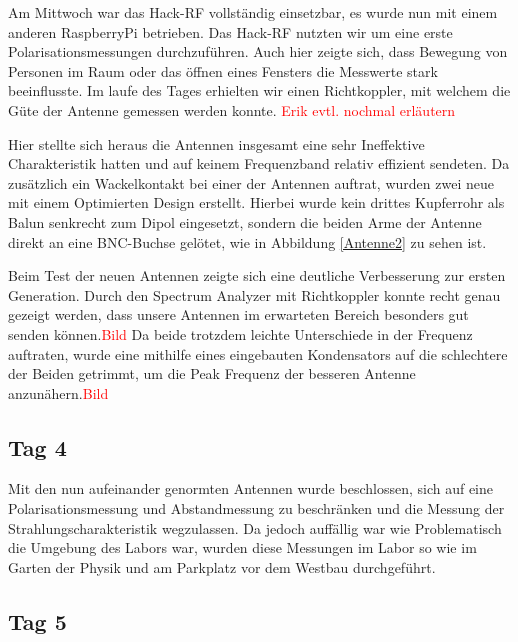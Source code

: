 \documentclass[titlepage,11pt,a4paper,ngerman]{article}
\begin{document}
Am Mittwoch war das Hack-RF vollständig einsetzbar, es wurde nun mit einem anderen RaspberryPi betrieben. Das Hack-RF nutzten wir um eine erste Polarisationsmessungen durchzuführen. Auch hier zeigte sich, dass Bewegung von Personen im Raum oder das öffnen eines Fensters die Messwerte stark beeinflusste. Im laufe des Tages erhielten wir einen Richtkoppler, mit welchem die Güte der Antenne gemessen werden konnte. \textcolor{red}{Erik evtl. nochmal erläutern}\par
Hier stellte sich heraus die Antennen insgesamt eine sehr Ineffektive Charakteristik hatten und auf keinem Frequenzband relativ effizient sendeten. Da zusätzlich ein Wackelkontakt bei einer der Antennen auftrat, wurden zwei neue mit einem Optimierten Design erstellt. Hierbei wurde kein drittes Kupferrohr als Balun senkrecht zum Dipol eingesetzt, sondern die beiden Arme der Antenne direkt an eine BNC-Buchse gelötet, wie in Abbildung \ref{Antenne2} zu sehen ist.\par
Beim Test der neuen Antennen zeigte sich eine deutliche Verbesserung zur ersten Generation. Durch den Spectrum Analyzer mit Richtkoppler konnte recht genau gezeigt werden, dass unsere Antennen im erwarteten Bereich besonders gut senden können.\textcolor{red}{Bild} Da beide trotzdem leichte Unterschiede in der Frequenz auftraten, wurde eine mithilfe eines eingebauten Kondensators auf die schlechtere der Beiden getrimmt, um die Peak Frequenz der besseren Antenne anzunähern.\textcolor{red}{Bild} 

\subsection{Tag 4}

Mit den nun aufeinander genormten Antennen wurde beschlossen, sich auf eine  Polarisationsmessung und Abstandmessung zu beschränken und die Messung der Strahlungscharakteristik wegzulassen. Da jedoch auffällig war wie Problematisch die Umgebung des Labors war, wurden diese Messungen im Labor so wie im Garten der Physik und am Parkplatz vor dem Westbau durchgeführt.

\subsection{Tag 5}
\end{document}
